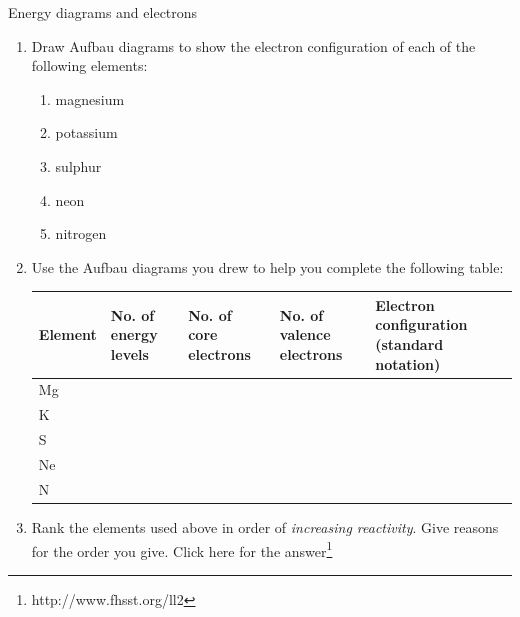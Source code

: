 \begin{exercises}{  Energy diagrams and electrons}
            \nopagebreak
        \label{m38741*id260063}\begin{enumerate}[noitemsep, label=\textbf{\arabic*}. ] 
            \label{m38741*uid106}\item Draw Aufbau diagrams to show the electron configuration of each of the following elements:
\label{m38741*id260079}\begin{enumerate}[noitemsep, label=\textbf{\alph*}. ] 
            \label{m38741*uid107}\item magnesium
\label{m38741*uid108}\item potassium
\label{m38741*uid109}\item sulphur
\label{m38741*uid110}\item neon
\label{m38741*uid111}\item nitrogen
\end{enumerate}
        \label{m38741*uid112}\item Use the Aufbau diagrams you drew to help you complete the following table:
       \begin{center}
\begin{tabular}{|p{1.6cm}|p{2.6cm}|p{2.6cm}|p{2.6cm}|p{3.6cm}|}\hline
\textbf{Element} & \textbf{No. of energy levels} & \textbf{No. of core electrons} & \textbf{No. of valence electrons} & \textbf{Electron configuration (standard notation)}\\\hline
Mg & & & & \\\hline
K & & & & \\\hline
S & & & & \\\hline
Ne & & & & \\\hline
N & & & & \\\hline
\end{tabular}
\end{center}    \par
  \label{m38741*uid113}\item Rank the elements used above in order of \textsl{increasing reactivity}. Give reasons for the order you give.
 Click here for the answer\footnote{http://www.fhsst.org/ll2}
        \end{enumerate}
\label{m38741*secfhsst!!!underscore!!!id783}
\end{exercises}            

